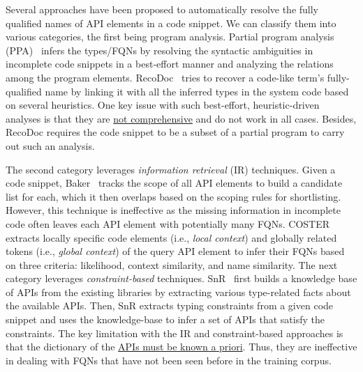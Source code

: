 Several approaches have been proposed to automatically resolve the fully qualified names of API elements in a code snippet. We can classify them into various categories, the first being program analysis. Partial program analysis (PPA)~\cite{dagenais-oopsla08} infers the types/FQNs by resolving the syntactic ambiguities in incomplete code snippets in a best-effort manner and analyzing the relations among the program elements. RecoDoc~\cite{dagenais-icse12} tries to recover a code-like term's fully-qualified name by linking it with all the inferred types in the system code based on several heuristics. One key issue with such best-effort, heuristic-driven analyses is that they are \underline{not comprehensive} and do not work in all cases. Besides, RecoDoc requires the code snippet to be a subset of a partial program to carry out such an analysis.

The second category leverages {\em information retrieval} (IR) techniques. Given a code snippet, Baker~\cite{liveapi14} tracks the scope of all API elements to build a candidate list for each, which it then overlaps based on the scoping rules for shortlisting. However, this technique is ineffective as the missing information in incomplete code often leaves each API element with potentially many FQNs.
COSTER~\cite{coster-ase19} extracts locally specific code elements (i.e., \textit{local context}) and globally related tokens (i.e., \textit{global context}) of the query API element to infer their FQNs based on three criteria: likelihood, context similarity, and name similarity.
The next category leverages {\em constraint-based} techniques. SnR~\cite{snr-icse22} first builds a knowledge base of APIs from the existing libraries by extracting various type-related facts about the available APIs. Then, SnR extracts typing constraints from a given code snippet and uses the knowledge-base to infer a set of APIs that satisfy the constraints.
The key limitation with the IR and constraint-based approaches is that the dictionary of the \underline{APIs must be known a priori}. Thus, they are ineffective in dealing with FQNs that have not been seen before in the training corpus.

